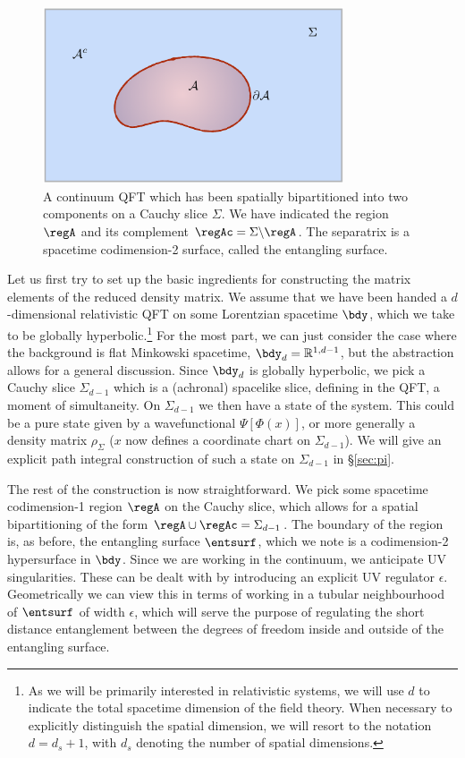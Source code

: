 \documentclass[12pt,openany]{book}
\begin{document}
\begin{figure}[htbp]
\begin{center}
\includegraphics[width=3.5in]{figures/continuum}
 \caption{A continuum QFT which has been spatially bipartitioned into two components on a Cauchy slice $\Sigma$. We have indicated the region $\regA$ and its complement $\regAc = \Sigma\backslash \regA$. The separatrix is a spacetime codimension-2 surface, called the entangling surface.}
\label{f:lattice}
\end{center}
\end{figure}
%

Let us first try to set up the basic ingredients for constructing the matrix elements of the reduced density matrix. We  assume  that we have been handed a $d$-dimensional relativistic QFT on some Lorentzian spacetime $\bdy$, which  we take to be  globally hyperbolic.\footnote{ As we will be primarily interested in relativistic systems, we will use $d$ to indicate the total spacetime dimension of the field theory. When necessary to  explicitly distinguish the spatial dimension, we will resort to the notation $d = d_s+1$,  with $d_s$ denoting the number of spatial dimensions.} For the most part, we can just consider the case where the background is flat Minkowski spacetime, $ \bdy_d = {\mathbb R}^{1,d-1}$, but the abstraction allows for a general discussion. Since $\bdy_d$ is globally hyperbolic, we pick a Cauchy slice $\Sigma_{d-1}$ which is a (achronal) spacelike slice, defining in the QFT, a moment of simultaneity. On $\Sigma_{d-1}$ we then have a state of the system. This could be a pure state given by a wavefunctional $\Psi[\Phi(x)]$, or more generally a density matrix $\rho_\Sigma$ ($x$ now defines a  coordinate chart on $\Sigma_{d-1}$). We will give an explicit path integral construction of  such a state on $\Sigma_{d-1}$ in \S\ref{sec:pi}.

The rest of the construction is now straightforward. We pick some  spacetime codimension-1 region $\regA$ on the Cauchy slice, which allows for a spatial bipartitioning of the form $\regA \cup \regAc = \Sigma_{d-1}$. The boundary of the region is, as before, the entangling surface $\entsurf$, which we note is a codimension-2 hypersurface in $\bdy$. Since we are working in the continuum, we
anticipate UV singularities. These can be dealt with by introducing an explicit UV  regulator $\epsilon$. Geometrically we can view this in terms of working in a tubular neighbourhood of $\entsurf$ of width $\epsilon$, which will serve the purpose of regulating the short distance entanglement between the degrees of freedom inside and outside of the entangling surface.
\end{document}
